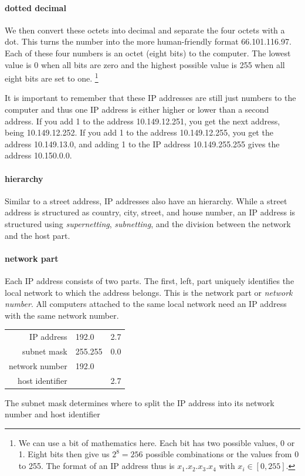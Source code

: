 \paragraph{dotted decimal}
We then convert these octets into decimal and separate the four octets with a dot.
This turns the number  into the more human-friendly format 66.101.116.97.
Each of these four numbers is an octet (eight bits) to the computer.
The lowest value is 0 when all bits are zero and the highest possible value is 255 when all eight bits are set to one.%
   \footnote{%
      We can use a bit of mathematics here.
      Each bit has two possible values, 0 or 1.
      Eight bits then give us $2^8 = 256$ possible combinations or the values from 0 to 255.
      The format of an \acs{IP} address thus is $x_1.x_2.x_3.x_4$ with $x_i \in [0,255]$.
   }

It is important to remember that these \acs{IP} addresses are still just numbers to the computer and thus one \acs{IP} address is either higher or lower than a second address.
If you add 1 to the address 10.149.12.251, you get the next address, being 10.149.12.252.
If you add 1 to the address 10.149.12.255, you get the address 10.149.13.0, and adding 1 to the \acs{IP} address 10.149.255.255 gives the address 10.150.0.0.

\paragraph{hierarchy}
Similar to a street address, \acs{IP} addresses also have an hierarchy.
While a street address is structured as country, city, street, and house number, an \acs{IP} address is structured using \emph{supernetting}, \emph{subnetting}, and the division between the network and the host part.

\paragraph{network part}
Each \acs{IP} address consists of two parts.
The first, left, part uniquely identifies the local network to which the address belongs.
This is the network part or \emph{network number}.%
All computers attached to the same local network need an \acs{IP} address with the same network number.

\begin{margintable}
\begin{tabular}{rl@{.}r}
\textcolor{spot5}{\acs{IP} address} & \textcolor{spot1}{192.0} & \textcolor{spot2}{2.7} \\
\textcolor{spot5}{subnet mask}      & 255.255                  & 0.0                    \\
\textcolor{spot5}{network number}   & \textcolor{spot1}{192.0} &                        \\
\textcolor{spot5}{host identifier}  &                          & \textcolor{spot2}{2.7} \\
\end{tabular}
\caption{The subnet mask determines where to split the \acs{IP} address into its network number and host identifier}
\label{tab:network-host-part}
\end{margintable}

